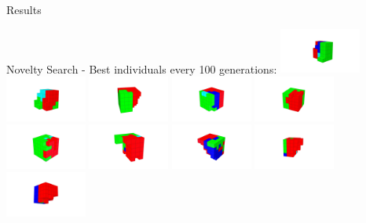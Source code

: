\documentclass{beamer}
\begin{document}
\begin{frame}[allowframebreaks]{Results}
\begin{minipage}{\textwidth}
\begin{block}{Novelty Search - Best individuals every 100 generations:}
\includegraphics[width=0.2\textwidth]{figures/Robots/n_3_g_100.jpg}
\includegraphics[width=0.2\textwidth]{figures/Robots/n_3_g_200.jpg}
\includegraphics[width=0.2\textwidth]{figures/Robots/n_3_g_300.jpg}
\includegraphics[width=0.2\textwidth]{figures/Robots/n_3_g_400.jpg}
\includegraphics[width=0.2\textwidth]{figures/Robots/n_3_g_500.jpg}\\
\includegraphics[width=0.2\textwidth]{figures/Robots/n_3_g_600.jpg}
\includegraphics[width=0.2\textwidth]{figures/Robots/n_3_g_700.jpg}
\includegraphics[width=0.2\textwidth]{figures/Robots/n_3_g_800.jpg}
\includegraphics[width=0.2\textwidth]{figures/Robots/n_3_g_900.jpg}
\includegraphics[width=0.2\textwidth]{figures/Robots/n_3_g_1000.jpg}
\end{block}


\end{minipage}
\end{frame}
\end{document}
